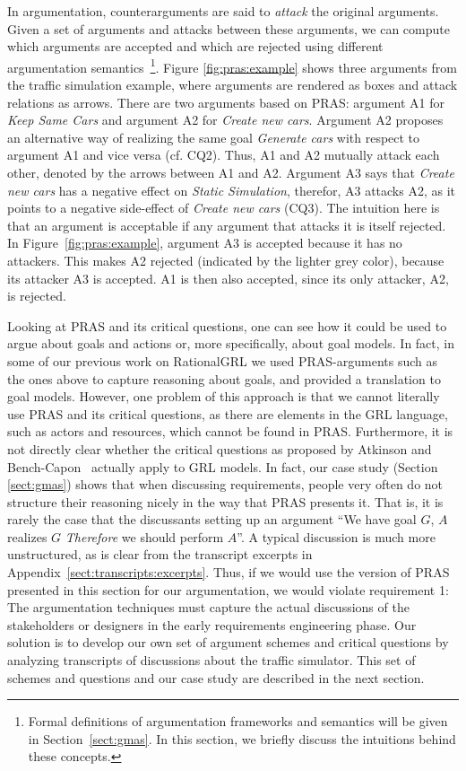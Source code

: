 In argumentation, counterarguments are said to \emph{attack} the original arguments. Given a set of arguments and attacks between these arguments, we can compute which arguments are accepted and which are rejected using different argumentation semantics~\cite{Dung1995}\footnote{Formal definitions of argumentation frameworks and semantics will be given in Section~\ref{sect:gmas}. In this section, we briefly discuss the intuitions behind these concepts.}. Figure \ref{fig:pras:example} shows three arguments from the traffic simulation example, where arguments are rendered as boxes and attack relations as arrows. There are two arguments based on PRAS: argument A1 for \emph{Keep Same Cars} and argument A2 for \emph{Create new cars}. Argument A2 proposes an alternative way of realizing the same goal \emph{Generate cars} with respect to argument A1 and vice versa (cf. CQ2). Thus, A1 and A2 mutually attack each other, denoted by the arrows between A1 and A2. Argument A3 says that \emph{Create new cars} has a negative effect on \emph{Static Simulation}, therefor, A3 attacks A2, as it points to a negative side-effect of \emph{Create new cars} (CQ3). The intuition here is that an argument is acceptable if any argument that attacks it is itself rejected. In Figure~\ref{fig:pras:example}, argument A3 is accepted because it has no attackers. This makes A2 rejected (indicated by the lighter grey color), because its attacker A3 is accepted. A1 is then also accepted, since its only attacker, A2, is rejected. 

Looking at PRAS and its critical questions, one can see how it could be used to argue about goals and actions or, more specifically, about goal models. In fact, in some of our previous work on RationalGRL \cite{vanzee-etal:renext2015,vanZee-etal:er2016} we used PRAS-arguments such as the ones above to capture reasoning about goals, and provided a translation to goal models. However, one problem of this approach is that we cannot literally use PRAS and its critical questions, as there are elements in the GRL language, such as actors and resources, which cannot be found in PRAS. Furthermore, it is not directly clear whether the critical questions as proposed by Atkinson and Bench-Capon~\cite{atkinson2007} actually apply to GRL models. In fact, our case study (Section \ref{sect:gmas}) shows that when discussing requirements, people very often do not structure their reasoning nicely in the way that PRAS presents it. That is, it is rarely the case that the discussants setting up an argument ``We have goal $G$, $A$ realizes $G$ \emph{Therefore} we should perform $A$''. A typical discussion is much more unstructured, as is clear from the transcript excerpts in Appendix~\ref{sect:transcripts:excerpts}. Thus, if we would use the version of PRAS presented in this section for our argumentation, we would violate requirement 1: The argumentation techniques must capture the actual discussions of the stakeholders or designers in the early requirements engineering phase. Our solution is to develop our own set of argument schemes and critical questions by analyzing transcripts of discussions about the traffic simulator. This set of schemes and questions and our case study are described in the next section. 

